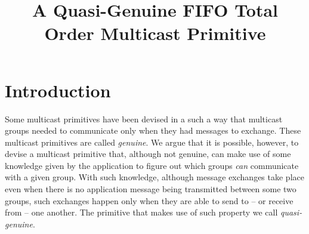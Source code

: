 \documentclass[times, 10pt]{article}
\begin{document}
\newcommand{\mv}[1]{\ensuremath{\operatorname{\mathit{#1}}}}
\newcommand{\bc}[1]{\textcolor{dark}{#1}}
\newtheorem{lems}{Lemma}
\newtheorem{props}{Proposition}
\newtheorem{thms}{Theorem}
\newtheorem{defs}{Definition}
\newtheorem{obs}{Observation}

\newcommand{\code}[1]{\texttt{\small{\textbf{#1}}}}

\newcommand{\blankline}{\vspace{4 mm}}
\newcommand{\cms}{\mbox{QGFTO-Mcast}}
\newcommand{\cmd}{\mbox{QGFTO-Deliver}}
\newcommand{\cmdel}[1]{\mbox{\cmd({#1})}}
\newcommand{\cmsend}[1]{\mbox{\cms({#1})}}
\newcommand{\tconsm}{T_{cons}}
\newcommand{\tcons}{\mbox{$\tconsm$}}
\newcommand{\opt}{\mbox{OPT-Deliver}}
\newcommand{\cons}{\mbox{QGFTO-Deliver}}
\newcommand{\rmc}{\mbox{FR-MCast}}
\newcommand{\rmd}{\mbox{FR-Deliver}}
\newcommand{\optdel}[1]{\mbox{\opt({#1})}}
\newcommand{\consdel}[1]{\mbox{\cons({#1})}}
\newcommand{\rmcast}[2]{\mbox{\rmc({#1},{#2})}}
\newcommand{\rmdel}[1]{\mbox{\rmd({#1})}}


\title{A Quasi-Genuine FIFO Total Order Multicast Primitive}


\maketitle

\begin{abstract}


\end{abstract}

\section{Introduction}
\label{sec:intro}

Some multicast primitives have been devised in a such a way that multicast groups needed to communicate only when they had messages to exchange. These multicast primitives are called \emph{genuine}. We argue that it is possible, however, to devise a multicast primitive that, although not genuine, can make use of some knowledge given by the application to figure out which groups \emph{can} communicate with a given group. With such knowledge, although message exchanges take place even when there is no application message being transmitted between some two groups, such exchanges happen only when they are able to send to -- or receive from -- one another. The primitive that makes use of such property we call \emph{quasi-genuine}. 
\end{document}
